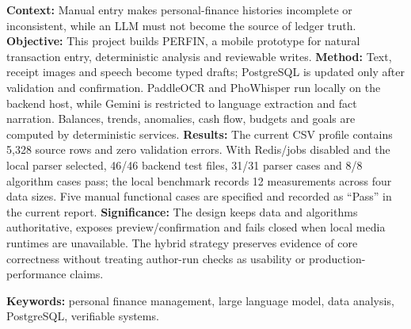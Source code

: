 
\textbf{Context:} Manual entry makes personal-finance histories incomplete or inconsistent, while an LLM must not become the source of ledger truth. \textbf{Objective:} This project builds PERFIN, a mobile prototype for natural transaction entry, deterministic analysis and reviewable writes. \textbf{Method:} Text, receipt images and speech become typed drafts; PostgreSQL is updated only after validation and confirmation. PaddleOCR and PhoWhisper run locally on the backend host, while Gemini is restricted to language extraction and fact narration. Balances, trends, anomalies, cash flow, budgets and goals are computed by deterministic services. \textbf{Results:} The current CSV profile contains 5,328 source rows and zero validation errors. With Redis/jobs disabled and the local parser selected, 46/46 backend test files, 31/31 parser cases and 8/8 algorithm cases pass; the local benchmark records 12 measurements across four data sizes. Five manual functional cases are specified and recorded as ``Pass'' in the current report. \textbf{Significance:} The design keeps data and algorithms authoritative, exposes preview/confirmation and fails closed when local media runtimes are unavailable. The hybrid strategy preserves evidence of core correctness without treating author-run checks as usability or production-performance claims.

\vspace{0.5cm}
\noindent\textbf{Keywords:} personal finance management, large language model, data analysis, PostgreSQL, verifiable systems.
